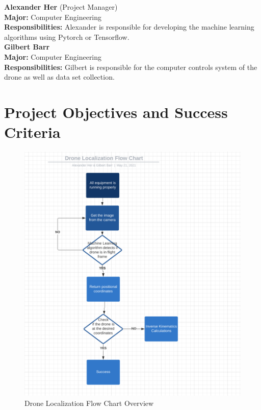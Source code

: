 \documentclass[12pt,onecolumn]{IEEEtran}			%
\begin{document}
\vspace{12pt} 


\textbf{Alexander Her} (Project Manager)\\ 
\textbf{Major:} Computer Engineering\\
\textbf{Responsibilities:} Alexander is responsible for developing the machine learning algorithms using Pytorch or Tensorflow. \\

\textbf{Gilbert Barr}\\
\textbf{Major:} Computer Engineering\\ 
\textbf{Responsibilities:} Gilbert is responsible for the computer controls system of the drone as well as data set collection. \\ 



 
 \section{Project Objectives and Success Criteria}
 
 \vspace{12pt} 
 
  \begin{figure}[hp]
    \centering
    \includegraphics[width=12cm]{Images/drone localization flow chart.PNG} 
    \caption{Drone Localization Flow Chart Overview}
    \label{fig:Drone Flowchart}
\end{figure}
\end{document}
